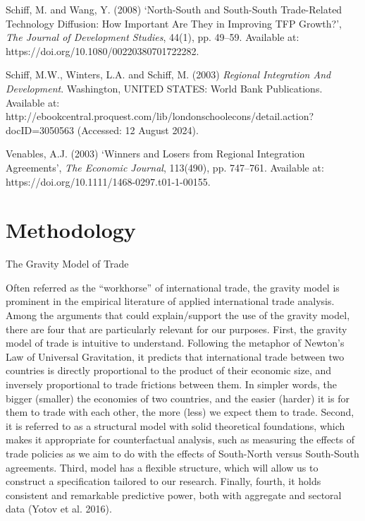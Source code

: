 \documentclass{article}%
\begin{document}
Schiff, M. and Wang, Y. (2008) `North-South and South-South
Trade-Related Technology Diffusion: How Important Are They in Improving
TFP Growth?', \emph{The Journal of Development Studies}, 44(1), pp.
49--59. Available at: https://doi.org/10.1080/00220380701722282.

Schiff, M.W., Winters, L.A. and Schiff, M. (2003) \emph{Regional
Integration And Development}. Washington, UNITED STATES: World Bank
Publications. Available at:
http://ebookcentral.proquest.com/lib/londonschoolecons/detail.action?docID=3050563
(Accessed: 12 August 2024).

Venables, A.J. (2003) `Winners and Losers from Regional Integration
Agreements', \emph{The Economic Journal}, 113(490), pp. 747--761.
Available at: https://doi.org/10.1111/1468-0297.t01-1-00155.

%
\section{Methodology}%
\label{sec:Methodology}%
The Gravity Model of Trade

Often referred as the ``workhorse'' of international trade, the gravity
model is prominent in the empirical literature of applied international
trade analysis. Among the arguments that could explain/support the use
of the gravity model, there are four that are particularly relevant for
our purposes. First, the gravity model of trade is intuitive to
understand. Following the metaphor of Newton's Law of Universal
Gravitation, it predicts that international trade between two countries
is directly proportional to the product of their economic size, and
inversely proportional to trade frictions between them. In simpler
words, the bigger (smaller) the economies of two countries, and the
easier (harder) it is for them to trade with each other, the more (less)
we expect them to trade. Second, it is referred to as a structural model
with solid theoretical foundations, which makes it appropriate for
counterfactual analysis, such as measuring the effects of trade policies
as we aim to do with the effects of South-North versus South-South
agreements. Third, model has a flexible structure, which will allow us
to construct a specification tailored to our research. Finally, fourth,
it holds consistent and remarkable predictive power, both with aggregate
and sectoral data (Yotov et al. 2016).
\end{document}
